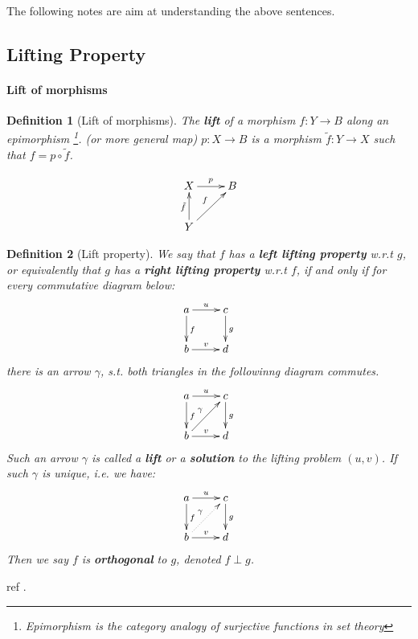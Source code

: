 \documentclass{article}
\numberwithin{equation}{subsection} %
\newtheorem{defi}{Definition}[section]
\theoremstyle{definition}
\begin{document}
    The following notes are aim at understanding the above sentences.

    \subsection{Lifting Property}
    \label{sec:Lifting-Property}
    \paragraph{Lift of morphisms}
    \begin{defi}[Lift of morphisms]
        The \textbf{lift} of a morphism $f: Y\to B$ along an epimorphism
        \footnote{Epimorphism is the category analogy of surjective
        functions in set theory}. (or more general map) $p:X\to B$ is a
        morphism $\tilde{f}: Y\to X$ such that $f = p\circ\tilde{f}$.
    \end{defi}
    $$
    \xymatrix{
        X\ar[r]^p                    & B \\
        Y\ar[ur]^f\ar[u]^{\tilde{f}} & \\
    }
    $$
    \begin{defi}[Lift property]
        We say that $f$ has a \textbf{left lifting property} w.r.t $g$, or
        equivalently that $g$ has a \textbf{right lifting property} w.r.t
        $f$, if and only if for every commutative diagram below:
        $$
        \xymatrix{
        a\ar[r]^u\ar[d]^f & c\ar[d]^g \\
        b\ar[r]^v         & d
        }
        $$
        there is an arrow $\gamma$, s.t. both triangles in the followinng
        diagram commutes.
        $$ \xymatrix{
        a\ar[r]^u\ar[d]^f         & c\ar[d]^g \\
        b\ar[r]^v\ar[ru]^{\gamma} & d
        }$$
        Such an arrow $\gamma$ is called a \textbf{lift} or a 
        \textbf{solution} to the lifting problem $(u,v)$.
        If such $\gamma$ is unique, i.e. we have:
        $$ \xymatrix{
        a\ar[r]^u\ar[d]^f         & c\ar[d]^g \\
        b\ar[r]^v\ar@{.>}[ru]^{\gamma} & d
        }$$
        Then we say $f$ is \textbf{orthogonal} to $g$, denoted $f \perp g$.
    \end{defi}
    ref \cite{nlab-lift}.
   
\end{document}
